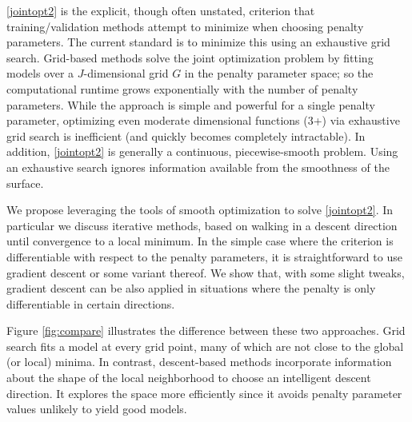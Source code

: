 \documentclass[10pt,letterpaper]{article}
\begin{document}
\eqref{jointopt2} is the explicit, though often unstated, criterion that training/validation methods attempt to minimize when choosing penalty parameters. The current standard is to minimize this using an exhaustive grid search. Grid-based methods solve the joint optimization problem by fitting models over a $J$-dimensional grid $G$ in the penalty parameter space; so the computational runtime grows exponentially with the number of penalty parameters. While the approach is simple and powerful for a single penalty parameter, optimizing even moderate dimensional functions (3+) via exhaustive grid search is inefficient (and quickly becomes completely intractable).  In addition, \eqref{jointopt2} is generally a continuous, piecewise-smooth problem. Using an exhaustive search ignores information available from the smoothness of the surface.

We propose leveraging the tools of smooth optimization to solve \eqref{jointopt2}. In particular we discuss iterative methods, based on walking in a descent direction until convergence to a local minimum. In the simple case where the criterion is differentiable with respect to the penalty parameters, it is straightforward to use gradient descent or some variant thereof. We show that, with some slight tweaks, gradient descent can be also applied in situations where the penalty is only differentiable in certain directions.

Figure \ref{fig:compare} illustrates the difference between these two approaches. Grid search fits a model at every grid point, many of which are not close to the global (or local) minima. In contrast, descent-based methods incorporate information about the shape of the local neighborhood to choose an intelligent descent direction. It explores the space more efficiently since it avoids penalty parameter values unlikely to yield good models.
\end{document}
